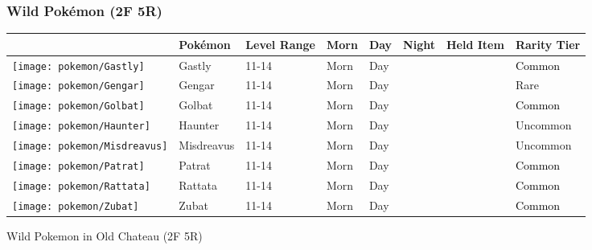 \subsubsection{Wild Pokémon (2F 5R)}%
\label{ssubsec:WildPokmon(2F5R)}%
\begin{longtable}{||l l l l l l l l||}%
\hline%
\rowcolor{gray}%
&Pokémon&Level Range&Morn&Day&Night&Held Item&Rarity Tier\\%
\hline%
\endhead%
\hline%
\rowcolor{gray}%
\texttt{[image: pokemon/Gastly]}&Gastly&11{-}14&Morn&Day&&&\textcolor{black}{%
Common%
}\\%
\hline%
\rowcolor{gray}%
\texttt{[image: pokemon/Gengar]}&Gengar&11{-}14&Morn&Day&&&\textcolor{RedOrange}{%
Rare%
}\\%
\hline%
\rowcolor{gray}%
\texttt{[image: pokemon/Golbat]}&Golbat&11{-}14&Morn&Day&&&\textcolor{black}{%
Common%
}\\%
\hline%
\rowcolor{gray}%
\texttt{[image: pokemon/Haunter]}&Haunter&11{-}14&Morn&Day&&&\textcolor{OliveGreen}{%
Uncommon%
}\\%
\hline%
\rowcolor{gray}%
\texttt{[image: pokemon/Misdreavus]}&Misdreavus&11{-}14&Morn&Day&&&\textcolor{OliveGreen}{%
Uncommon%
}\\%
\hline%
\rowcolor{gray}%
\texttt{[image: pokemon/Patrat]}&Patrat&11{-}14&Morn&Day&&&\textcolor{black}{%
Common%
}\\%
\hline%
\rowcolor{gray}%
\texttt{[image: pokemon/Rattata]}&Rattata&11{-}14&Morn&Day&&&\textcolor{black}{%
Common%
}\\%
\hline%
\rowcolor{gray}%
\texttt{[image: pokemon/Zubat]}&Zubat&11{-}14&Morn&Day&&&\textcolor{black}{%
Common%
}\\%
\hline%
\end{longtable}%
\caption{Wild Pokemon in Old Chateau (2F 5R)}